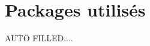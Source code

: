 \documentclass[12pt,a4paper]{book}
\begin{document}
\section{Packages utilisés}

AUTO FILLED....
\end{document}

